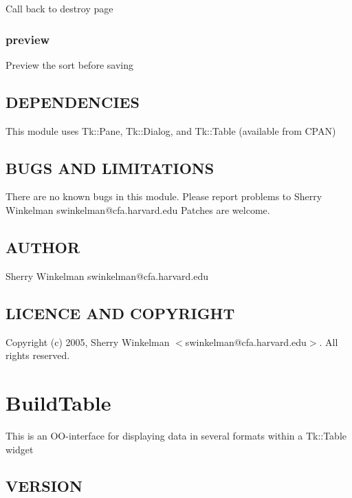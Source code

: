 \documentclass{article}
\begin{document}
Call back to destroy page

\subsubsection*{preview\label{BuildSort_preview}}


Preview the sort before saving

\subsection*{DEPENDENCIES\label{BuildSort_DEPENDENCIES}}


This module uses Tk::Pane, Tk::Dialog, and Tk::Table (available from CPAN)

\subsection*{BUGS AND LIMITATIONS\label{BuildSort_BUGS_AND_LIMITATIONS}}


There are no known bugs in this module.
Please report problems to Sherry Winkelman swinkelman@cfa.harvard.edu
Patches are welcome.

\subsection*{AUTHOR\label{BuildSort_AUTHOR}}


Sherry Winkelman swinkelman@cfa.harvard.edu

\subsection*{LICENCE AND COPYRIGHT\label{BuildSort_LICENCE_AND_COPYRIGHT}}


Copyright (c) 2005, Sherry Winkelman $<$swinkelman@cfa.harvard.edu$>$. All rights 
reserved.

\clearpage
\section{BuildTable\label{BuildTable}}


This is an OO-interface for displaying data in several formats
within a Tk::Table widget

\subsection*{VERSION\label{BuildTable_VERSION}}
\end{document}
